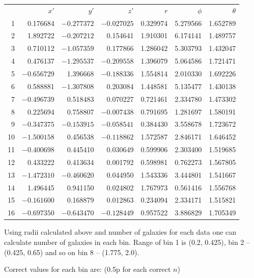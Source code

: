 \begin{description}
  \begin{center}
  \begin{tabular}{rrrrrrr}
  & $x'$ & $y'$ & $z'$ & $r$ & $\phi$ & $\theta$\\
  1 & 0.176684 & $-0.277372$ & $-0.027025$ & 0.329974 & 5.279566 & 1.652789\\
  2 & 1.892722 & $-0.207212$ & 0.154641 & 1.910301 & 6.174141 & 1.489757\\
  3 & 0.710112 & $-1.057359$ & 0.177866 & 1.286042 & 5.303793 & 1.432047\\
  4 & 0.476137 & $-1.295537$ & $-0.209558$ & 1.396079 & 5.064586 & 1.721471\\
  5 & $-0.656729$ & 1.396668 & $-0.188336$ & 1.554814 & 2.010330 & 1.692226\\
  6 & 0.588881 & $-1.307808$ & 0.203084 & 1.448581 & 5.135477 & 1.430138\\
  7 & $-0.496739$ & 0.518483 & 0.070227 & 0.721461 & 2.334780 & 1.473302\\
  8 & 0.225694 & 0.758807 & $-0.007438$ & 0.791695 & 1.281697 & 1.580191\\
  9 & $-0.347375$ & $-0.153915$ & $-0.058541$ & 0.384430 & 3.558678 & 1.723672\\
  10 & $-1.500158$ & 0.456538 & $-0.118862$ & 1.572587 & 2.846171 & 1.646452\\
  11 & $-0.400698$ & 0.445410 & 0.030649 & 0.599906 & 2.303400 & 1.519685\\
  12 & 0.433222 & 0.413634 & 0.001792 & 0.598981 & 0.762273 & 1.567805\\
  13 & $-1.472310$ & $-0.460620$ & 0.044950 & 1.543336 & 3.444801 & 1.541667\\
  14 & 1.496445 & 0.941150 & 0.024802 & 1.767973 & 0.561416 & 1.556768\\
  15 & $-0.161600$ & 0.168879 & 0.012863 & 0.234094 & 2.334171 & 1.515821\\
  16 & $-0.697350$ & $-0.643470$ & $-0.128449$ & 0.957522 & 3.886829 & 1.705349
  \end{tabular}
  \end{center}

\item[(e)] Using radii calculated above and number of galaxies for each
  data one can calculate number of galaxies in each bin. Range of bin 1
  is (0.2, 0.425), bin 2 -- (0.425, 0.65) and so on bin 8 --
  (1.775, 2.0).

  Correct values for each bin are: (0.5p for each correct $n$)


\end{description}
